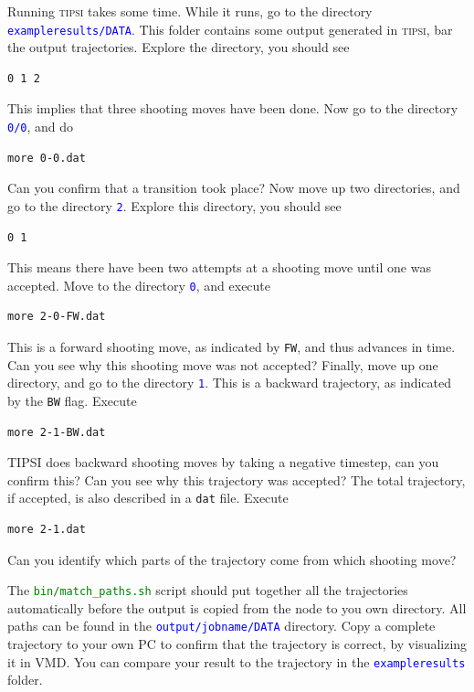 \documentclass[]{article}
\begin{document}
Running \textsc{tipsi} takes some time. While it runs, go to the directory \textcolor{blue}{\texttt{exampleresults/DATA}}. This folder contains some output generated in \textsc{tipsi}, bar the output trajectories. Explore the directory, you should see
%
\begin{lstlisting}
0 1 2
\end{lstlisting}
%
This implies that three shooting moves have been done. Now go to the directory \textcolor{blue}{\texttt{0/0}}, and do
%
\begin{lstlisting}
more 0-0.dat
\end{lstlisting}
%
Can you confirm that a transition took place? Now move up two directories, and go to the directory \textcolor{blue}{\texttt{2}}. Explore this directory, you should see
%
\begin{lstlisting}
0 1
\end{lstlisting}
%
This means there have been two attempts at a shooting move until one was accepted. Move to the directory \textcolor{blue}{\texttt{0}}, and execute
%
\begin{lstlisting}
more 2-0-FW.dat
\end{lstlisting}
%
This is a forward shooting move, as indicated by \texttt{FW}, and thus advances in time. Can you see why this shooting move was not accepted? Finally, move up one directory, and go to the directory \textcolor{blue}{\texttt{1}}. This is a backward trajectory, as indicated by the \texttt{BW} flag. Execute
%
\begin{lstlisting}
more 2-1-BW.dat
\end{lstlisting}
%
\textsc{TIPSI} does backward shooting moves by taking a negative timestep, can you confirm this? Can you see why this trajectory was accepted? The total trajectory, if accepted, is also described in a \texttt{dat} file. Execute
%
\begin{lstlisting}
more 2-1.dat
\end{lstlisting}
%
Can you identify which parts of the trajectory come from which shooting move?

The \textcolor{green}{\texttt{bin/match\_paths.sh}} script should put together all the trajectories automatically before the output is copied from the node to you own directory. All paths can be found in the \textcolor{blue}{\texttt{output/jobname/DATA}} directory. Copy a complete trajectory to your own PC to confirm that the trajectory is correct, by visualizing it in \textsc{VMD}. You can compare your result to the trajectory in the \textcolor{blue}{\texttt{exampleresults}} folder.
\end{document}
